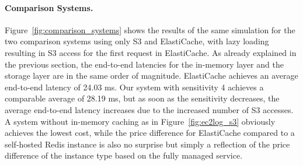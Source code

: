 \paragraph{Comparison Systems.}
Figure~\ref{fig:comparison_systems} shows the results of the same simulation for the two comparison systems using only S3 and ElastiCache, with lazy loading resulting in S3 access for the first request in ElastiCache. As already explained in the previous section, the end-to-end latencies for the in-memory layer and the storage layer are in the same order of magnitude. ElastiCache achieves an average end-to-end latency of 24.03 ms. Our system with sensitivity 4 achieves a comparable average of 28.19 ms, but as soon as the sensitivity decreases, the average end-to-end latency increases due to the increased number of S3 accesses. A system without in-memory caching as in Figure~\ref{fig:ec2log_s3} obviously achieves the lowest cost, while the price difference for ElastiCache compared to a self-hosted Redis instance is also no surprise but simply a reflection of the price difference of the instance type based on the fully managed service.


